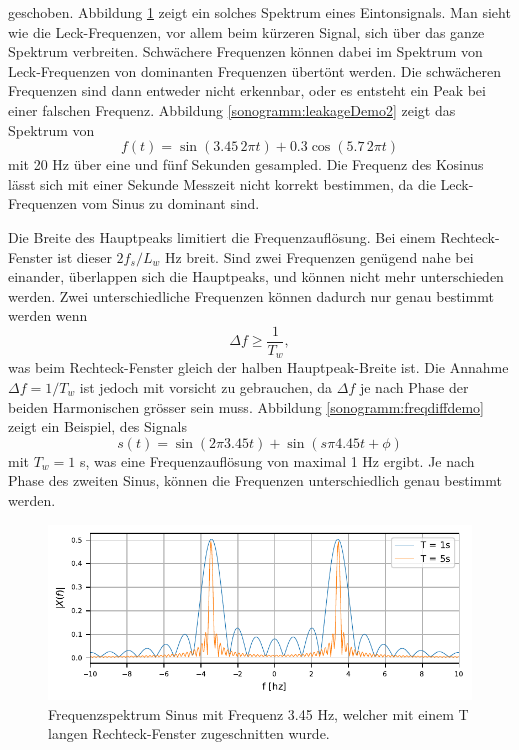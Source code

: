 geschoben.
Abbildung \ref{sonogramm:leakageDemo} zeigt ein solches Spektrum eines Eintonsignals.
Man sieht wie die Leck-Frequenzen, vor allem beim kürzeren Signal,
sich über das ganze Spektrum verbreiten.
Schwächere Frequenzen können dabei im Spektrum von Leck-Frequenzen von dominanten Frequenzen
übertönt werden.
Die schwächeren Frequenzen sind dann entweder nicht erkennbar, oder es entsteht ein Peak 
bei einer falschen Frequenz. 
Abbildung \ref{sonogramm:leakageDemo2} zeigt das Spektrum von 
\begin{equation}
    f(t) = \sin(3.45\, 2\pi t) + 0.3  \cos(5.7\,  2\pi t)
\label{sonogramm:eq:sigLeck}
\end{equation}
mit 20 Hz über eine und fünf Sekunden gesampled.
Die Frequenz des Kosinus lässt sich mit einer Sekunde Messzeit nicht korrekt bestimmen, 
da die Leck-Frequenzen vom Sinus zu dominant sind.

Die Breite des Hauptpeaks limitiert die Frequenzauflösung.
Bei einem Rechteck-Fenster ist dieser $2f_s/L_w$ Hz breit.
Sind zwei Frequenzen genügend nahe bei einander, überlappen sich die Hauptpeaks, und können
nicht mehr unterschieden werden. 
Zwei unterschiedliche Frequenzen können dadurch nur genau bestimmt werden wenn
\begin{equation}
    \Delta f \geq \frac{1}{T_w},
\end{equation}
was beim Rechteck-Fenster gleich der halben Hauptpeak-Breite ist.
Die Annahme $\Delta f = 1/T_w$ ist jedoch mit vorsicht zu gebrauchen, da $\Delta f$ je nach 
Phase der beiden Harmonischen grösser sein muss.
Abbildung \ref{sonogramm:freqdiffdemo} zeigt ein Beispiel, des Signals
\begin{equation}
    s(t) = \sin(2\pi 3.45 t ) + \sin (s\pi 4.45 t + \phi)
\end{equation}
mit $T_w = 1$ s, was eine Frequenzauflösung von maximal 1 Hz ergibt.
Je nach Phase des zweiten Sinus, können die Frequenzen unterschiedlich genau
bestimmt werden.


\begin{figure}
    \centering
    \includegraphics{papers/sonogramm/images/RectWinHarmEx.pdf}
    \caption{Frequenzspektrum Sinus mit Frequenz 3.45 Hz, welcher mit einem T langen 
    Rechteck-Fenster zugeschnitten wurde.
    \label{sonogramm:leakageDemo}
    }
\end{figure}

